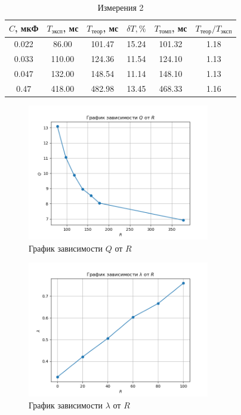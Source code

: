 \documentclass{article}%
\begin{document}
\begin{table}[h!]%
\centering%
\begin{tabular}{|c|c|c|c|c|c|}%
\hline%
$C$, мкФ&$T_{\text{эксп}}$, мс&$T_{\text{теор}}$, мс&$\delta T, \%$&$T_{\text{томп}}$, мс&$T_{\text{теор}}/T_{\text{эксп}}$\\%
\hline%
0.022&86.00&101.47&15.24&101.32&1.18\\%
\hline%
0.033&110.00&124.36&11.54&124.10&1.13\\%
\hline%
0.047&132.00&148.54&11.14&148.10&1.13\\%
\hline%
0.47&418.00&482.98&13.45&468.33&1.16\\%
\hline%
\end{tabular}%
\caption{Измерения 2}%
\end{table}

%


\begin{figure}[h!]%
\centering%
\includegraphics[width=300px]{Q_vs_R.png}%
\caption{График зависимости $Q$ от $R$}%
\end{figure}

%


\begin{figure}[h!]%
\centering%
\includegraphics[width=300px]{Lambda_vs_R.png}%
\caption{График зависимости $\lambda$ от $R$}%
\end{figure}
\end{document}
